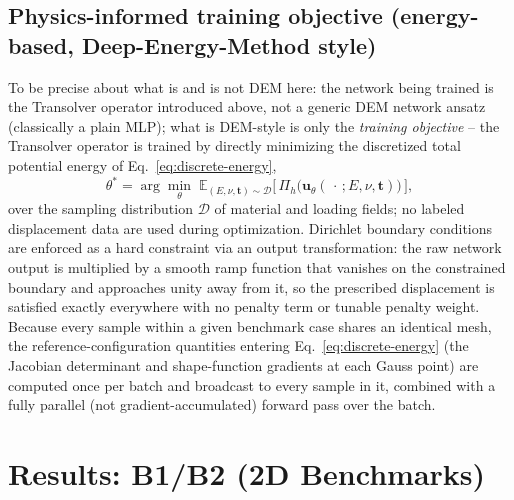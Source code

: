 \documentclass[final,5p,times]{elsarticle}
\begin{document}
\subsection{Physics-informed training objective (energy-based, Deep-Energy-Method style)}
To be precise about what is and is not DEM here: the network being
trained is the Transolver operator introduced above, not a generic DEM
network ansatz (classically a plain MLP); what is DEM-style is only the
\emph{training objective} -- the Transolver operator is trained by
directly minimizing the discretized total potential energy of
Eq.~\eqref{eq:discrete-energy},
\begin{equation}
  \theta^\ast = \arg\min_\theta \; \mathbb{E}_{(E,\nu,\mathbf{t})\sim\mathcal{D}}
  \big[\, \Pi_h\big(\mathbf{u}_\theta(\,\cdot\,;E,\nu,\mathbf{t})\big) \,\big],
  \label{eq:dem-objective}
\end{equation}
over the sampling distribution $\mathcal{D}$ of material and loading
fields; no labeled displacement data are used during optimization.
Dirichlet boundary conditions are enforced as a hard
constraint via an output transformation: the raw network output is
multiplied by a smooth ramp function that vanishes on the constrained
boundary and approaches unity away from it, so the prescribed displacement
is satisfied exactly everywhere with no penalty term or tunable penalty
weight. Because every sample within a given benchmark case shares an
identical mesh, the reference-configuration quantities entering
Eq.~\eqref{eq:discrete-energy} (the Jacobian determinant and shape-function
gradients at each Gauss point) are computed once per batch and broadcast to
every sample in it, combined with a fully parallel (not gradient-accumulated)
forward pass over the batch.

\section{Results: B1/B2 (2D Benchmarks)}
\label{sec:results-2d}
\end{document}
